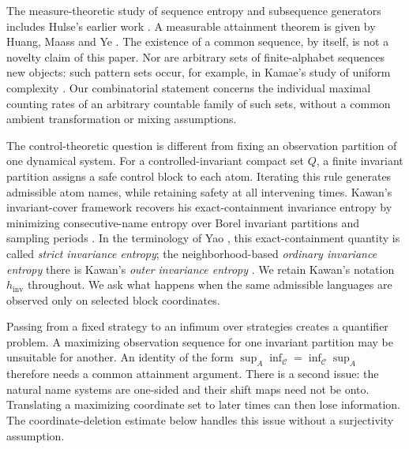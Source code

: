 \documentclass[11pt,reqno]{amsart}
\numberwithin{equation}{section}
\theoremstyle{definition}
\begin{document}
The measure-theoretic study of sequence entropy and subsequence generators
includes Hulse's earlier work \cite{Hulse1982}. A measurable attainment
theorem is given by Huang, Maass and Ye
\cite[Theorem~2.3]{HuangMaassYe2004}. The existence of a common
sequence, by itself, is not a novelty claim of this paper. Nor are arbitrary
sets of finite-alphabet sequences new objects: such pattern sets occur,
for example, in Kamae's study of uniform complexity \cite{KamaeUniform2009}.
Our combinatorial statement concerns the individual maximal counting rates
of an arbitrary countable family of such sets, without a common ambient
transformation or mixing assumptions.

The control-theoretic question is different from fixing an observation
partition of one dynamical system. For a controlled-invariant compact set
$Q$, a finite invariant partition assigns a safe control block to each
atom. Iterating this rule generates admissible atom names, while retaining
safety at all intervening times. Kawan's invariant-cover framework recovers
his exact-containment invariance entropy by minimizing consecutive-name entropy over
Borel invariant partitions and sampling periods
\cite[Definitions~2.8--2.9 and Theorem~2.3]{Kawan2013}.
In the terminology of Yao \cite[Section~2]{Yao2026}, this exact-containment
quantity is called \emph{strict invariance entropy}; the neighborhood-based
\emph{ordinary invariance entropy} there is Kawan's \emph{outer invariance
entropy} \cite[Definition~2.3]{Kawan2013}. We retain Kawan's notation
$h_{\mathrm{inv}}$ throughout.
We ask what happens when the same admissible languages are observed only
on selected block coordinates.

Passing from a fixed strategy to an infimum over strategies creates a
quantifier problem. A maximizing observation sequence for one invariant
partition may be unsuitable for another. An identity of the form
$\sup_A\inf_{\mathcal C}=\inf_{\mathcal C}\sup_A$ therefore needs a common
attainment argument. There is a second issue: the natural name systems
are one-sided and their shift maps need not be onto. Translating a
maximizing coordinate set to later times can then lose information.
The coordinate-deletion estimate below handles this issue without a
surjectivity assumption.
\end{document}
